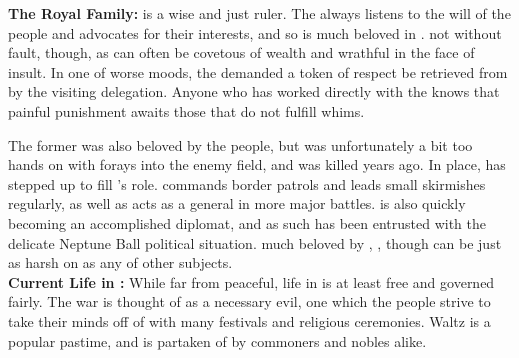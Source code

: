 \documentclass[blue]{NeptuneBall}
\begin{document}
{\bf The Royal Family:}
\cPacificanRuler{\King} \cPacificanRuler{} is a wise and just ruler. The \cPacificanRuler{\King} always listens to the will of the people and advocates for their interests, and so is much beloved in \pPacifica{}. \cPacificanRuler{\They} \cPacificanRuler{\are} not without fault, though, as \cPacificanRuler{\they} can often be covetous of wealth and wrathful in the face of insult. In one of \cPacificanRuler{\their} worse moods, the \cPacificanRuler{\King} demanded a token of respect be retrieved from \pAtlantis{} by the visiting delegation. Anyone who has worked directly with the \cPacificanRuler{\King} knows that painful punishment awaits those that do not fulfill \cPacificanRuler{\their} whims.

The former \cPacificanRulerSpouse{\King} \cPacificanRulerSpouse{} was also beloved by the people, but was unfortunately a bit too hands on with \cPacificanRulerSpouse{\their} forays into the enemy field, and was killed years ago. In \cPacificanRulerSpouse{\their} place, \cPrince{\Prince} \cPrince{} has stepped up to fill \cPrince{\their} \cPacificanRulerSpouse{\parent}'s role. \cPrince{} commands border patrols and leads small skirmishes regularly, as well as acts as a general in more major battles. \cPrince{} is also quickly becoming an accomplished diplomat, and as such has been entrusted with the delicate Neptune Ball political situation. \cPrince{\They} \cPrince{\are} much beloved by \cPrince{\their} \cPacificanRuler{\parent}, \cPacificanRuler{\King} \cPacificanRuler{}, though \cPacificanRuler{\they} can be just as harsh on \cPrince{} as any of \cPacificanRuler{\their} other subjects.\\

{\bf Current Life in \pPacifica{}:}
While far from peaceful, life in \pPacifica{} is at least free and governed fairly. The war is thought of as a necessary evil, one which the people strive to take their minds off of with many festivals and religious ceremonies. Waltz is a popular pastime, and is partaken of by commoners and nobles alike.
\end{document}
